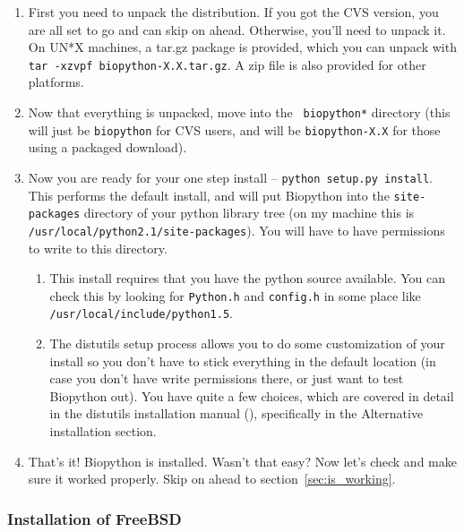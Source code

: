 \documentclass{report}
\begin{document}
\begin{enumerate}

\item First you need to unpack the distribution. If you got the CVS version, you are all set to go and can skip on ahead. Otherwise, you'll need to unpack it. On UN*X machines, a tar.gz package is provided, which you can unpack with \verb|tar -xzvpf biopython-X.X.tar.gz|. A zip file is also provided for other platforms.

\item Now that everything is unpacked, move into the \verb| biopython*| directory (this will just be \verb|biopython| for CVS users, and will be \verb|biopython-X.X| for those using a packaged download). 

\item Now you are ready for your one step install -- \verb|python setup.py install|. This performs the default install, and will put Biopython into the \verb|site-packages| directory of your python library tree (on my machine this is \verb|/usr/local/python2.1/site-packages|). You will have to have permissions to write to this directory. 

\begin{enumerate}

\item This install requires that you have the python source available. You can check this by looking for \verb|Python.h| and \verb|config.h| in some place like \verb|/usr/local/include/python1.5|.

\item The distutils setup process allows you to do some customization of your install so you don't have to stick everything in the default location (in case you don't have write permissions there, or just want to test Biopython out). You have quite a few choices, which are covered in detail in the distutils installation manual (), specifically in the Alternative installation section.

\end{enumerate}

\item That's it! Biopython is installed. Wasn't that easy? Now let's check and make sure it worked properly. Skip on ahead to section~\ref{sec:is_working}.

\end{enumerate}

\subsubsection{Installation of FreeBSD}
\end{document}
